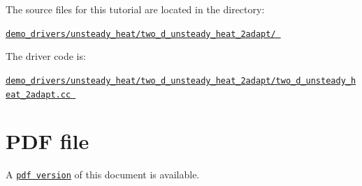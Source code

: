 \begin{DoxyItemize}
\item The source files for this tutorial are located in the directory\+: \begin{center} \href{../../../../demo_drivers/unsteady_heat/two_d_unsteady_heat_2adapt/}{\tt demo\+\_\+drivers/unsteady\+\_\+heat/two\+\_\+d\+\_\+unsteady\+\_\+heat\+\_\+2adapt/ } \end{center} 
\item The driver code is\+: \begin{center} \href{../../../../demo_drivers/unsteady_heat/two_d_unsteady_heat_2adapt/two_d_unsteady_heat_2adapt.cc}{\tt demo\+\_\+drivers/unsteady\+\_\+heat/two\+\_\+d\+\_\+unsteady\+\_\+heat\+\_\+2adapt/two\+\_\+d\+\_\+unsteady\+\_\+heat\+\_\+2adapt.\+cc } \end{center} 
\end{DoxyItemize}



 

 \hypertarget{index_pdf}{}\section{P\+D\+F file}\label{index_pdf}
A \href{../latex/refman.pdf}{\tt pdf version} of this document is available. 
